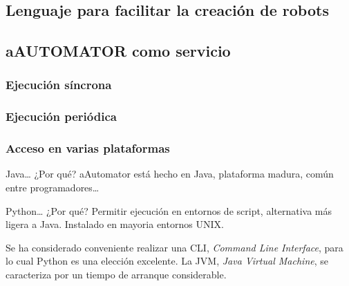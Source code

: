 \subsection[Lenguaje robots]{Lenguaje para facilitar la creación de
  robots}
\subsection{aAUTOMATOR como servicio}
\subsubsection{Ejecución síncrona}
\subsubsection{Ejecución periódica}
\subsubsection{Acceso en varias plataformas}
Java\ldots
¿Por qué? aAutomator está hecho en Java, plataforma madura, común
entre programadores\ldots{}

Python\ldots{}
¿Por qué? Permitir ejecución en entornos de script, alternativa más
ligera a Java. Instalado en mayoria entornos UNIX\@.

Se ha considerado conveniente realizar una CLI, \emph{Command Line
  Interface}, para lo cual Python es una elección excelente. La JVM,
\emph{Java Virtual Machine}, se caracteriza por un tiempo de arranque
considerable.
